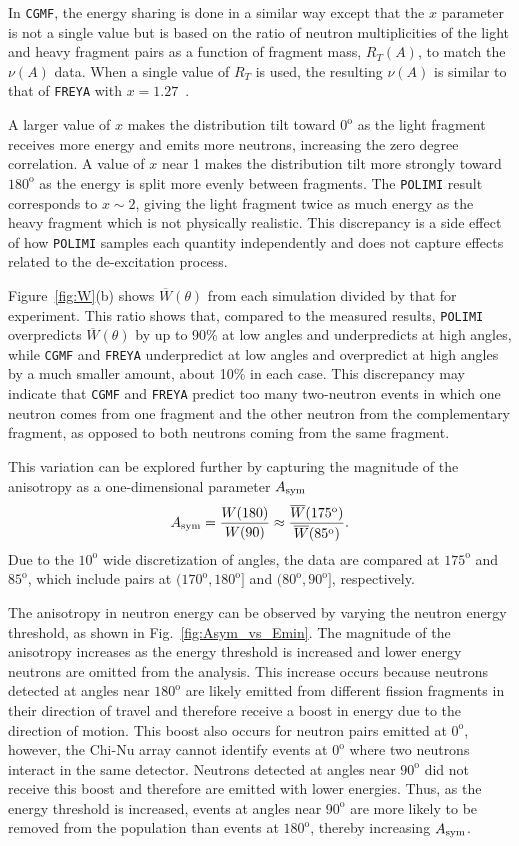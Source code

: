 \documentclass[preprint,12pt]{elsarticle}
\newcommand{\fig}[1]     {Fig.~\ref{#1}}
\newcommand{\figfirst}[1]  {Figure~\ref{#1}}
\newcommand{\cgmf}            {\texttt{CGMF}\xspace}
\newcommand{\freya}           {\texttt{FREYA}\xspace}
\newcommand{\polimi}          {\texttt{POLIMI}\xspace}
\newcommand{\Wtheta}         {\ensuremath{\overline{W}(\theta)}\xspace}
\newcommand{\Wth}[1]         {\ensuremath{\overline{W}(\degrees{#1})}\xspace}
\newcommand{\Asym}           {\ensuremath{A_{\rm{sym}}}\xspace}
\newcommand{\degrees}[1]{\ensuremath{#1^{\mathrm{o}}}\xspace}
\begin{document}
In \cgmf, the energy sharing is done in a similar way except that the $x$ parameter is not a single value but is based on the ratio of neutron multiplicities of the light and heavy fragment pairs as a function of fragment mass, $R_T(A)$, to match the $\nu(A)$ data. When a single value of $R_T$ is used, the resulting $\nu(A)$ is similar to that of \freya with $x=1.27$~\cite{Talou2011}. 

A larger value of $x$ makes the distribution tilt toward \degrees{0} as the light fragment receives more energy and emits more neutrons, increasing the zero degree correlation. A value of $x$ near 1 makes the distribution tilt more strongly toward \degrees{180} as the energy is split more evenly between fragments. The \polimi result corresponds to $x\sim2$, giving the light fragment twice as much energy as the heavy fragment which is not physically realistic. This discrepancy is a side effect of how \polimi samples each quantity independently and does not capture effects related to the de-excitation process. 

\figfirst{fig:W}(b) shows \Wtheta from each simulation divided by that for experiment. This ratio shows that, compared to the measured results, \polimi overpredicts \Wtheta by up to 90\% at low angles and underpredicts at high angles, while \cgmf and \freya underpredict at low angles and overpredict at high angles by a much smaller amount, about 10\% in each case. This discrepancy may indicate that \cgmf and \freya predict too many two-neutron events in which one neutron comes from one fragment and the other neutron from the complementary fragment, as opposed to both neutrons coming from the same fragment. 

This variation can be explored further by capturing the magnitude of the anisotropy as a one-dimensional parameter \Asym
\begin{equation}
\label{eq:Asym}
\Asym = \frac{W(180)}{W(90)}\approx\frac{\Wth{175}}{\Wth{85}}.
\end{equation}
Due to the \degrees{10} wide discretization of angles, the data are compared at \degrees{175} and \degrees{85}, which include pairs at $(\degrees{170},\degrees{180}]$ and $(\degrees{80},\degrees{90}]$, respectively.

The anisotropy in neutron energy can be observed by varying the neutron energy threshold, as shown in \fig{fig:Asym_vs_Emin}. The magnitude of the anisotropy increases as the energy threshold is increased and lower energy neutrons are omitted from the analysis. This increase occurs because neutrons detected at angles near \degrees{180} are likely emitted from different fission fragments in their direction of travel and therefore receive a boost in energy due to the direction of motion. This boost also occurs for neutron pairs emitted at \degrees{0}, however, the Chi-Nu array cannot identify events at \degrees{0} where two neutrons interact in the same detector. 
Neutrons detected at angles near \degrees{90} did not receive this boost and therefore are emitted with lower energies. Thus, as the energy threshold is increased, events at angles near \degrees{90} are more likely to be removed from the population than events at \degrees{180}, thereby increasing \Asym. 
\end{document}
